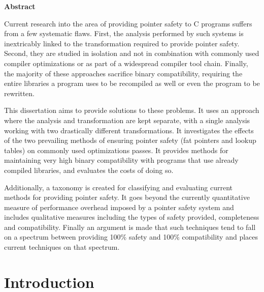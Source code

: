 \documentclass[a4paper,12pt,twoside,openright]{report}
\begin{document}
\pagestyle{empty}
\singlespacing

\onehalfspacing

\singlespacing
\newpage
{\Huge \bf Abstract}
\vspace{24pt} 

Current research into the area of providing pointer safety to C programs suffers from a few systematic flaws.
First, the analysis performed by such systems is inextricably linked to the transformation required to provide pointer safety.
Second, they are studied in isolation and not in combination with commonly used compiler optimizations or as part of a widespread compiler tool chain.
Finally, the majority of these approaches sacrifice binary compatibility, requiring the entire libraries a program uses to be recompiled as well or even the program to be rewritten.

This dissertation aims to provide solutions to these problems.
It uses an approach where the analysis and transformation are kept separate, with a single analysis working with two drastically different transformations.
It investigates the effects of the two prevailing methods of ensuring pointer safety (fat pointers and lookup tables) on commonly used optimizations passes.
It provides methods for maintaining very high binary compatibility with programs that use already compiled libraries, and evaluates the costs of doing so.

Additionally, a taxonomy is created for classifying and evaluating current methods for providing pointer safety.
It goes beyond the currently quantitative measure of performance overhead imposed by a pointer safety system and includes qualitative measures including the types of safety provided, completeness and compatibility.
Finally an argument is made that such techniques tend to fall on a spectrum between providing 100\% safety and 100\% compatibility and places current techniques on that spectrum.

\newpage
\vspace*{\fill}

\setcounter{page}{0}
\pagestyle{plain}
\tableofcontents
\listoffigures
\listoftables

\onehalfspacing


\chapter{Introduction}
\setcounter{page}{1} 
\end{document}

